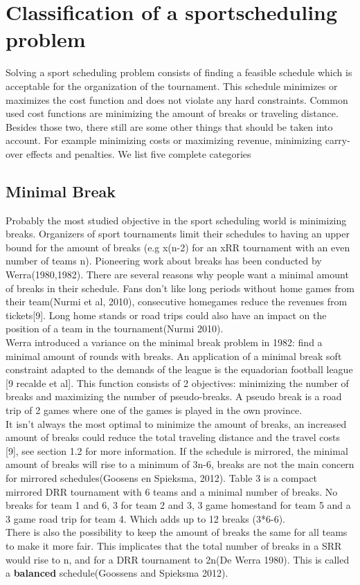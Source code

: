 \section{Classification of a sportscheduling problem}
Solving a sport scheduling problem consists of finding a feasible schedule which is acceptable for the organization of the tournament. This schedule minimizes or maximizes the cost function and does not violate any hard constraints. Common used cost functions are minimizing the amount of breaks or traveling distance. Besides those two, there still are some other things that should be taken into account. For example minimizing costs or maximizing revenue, minimizing carry-over effects  and penalties. We list five complete categories

\subsection{Minimal Break}
Probably the most studied objective in the sport scheduling world is minimizing breaks. Organizers of sport tournaments limit their schedules to having an upper bound for the amount of breaks (e.g x(n-2) for an xRR tournament with an even number of teams n). Pioneering work about breaks has been conducted by Werra(1980,1982). There are several reasons why people want a minimal amount of breaks in their schedule. Fans don’t like long periods without home games from their team(Nurmi et al, 2010), consecutive homegames reduce the revenues from tickets[9]. Long home stands or road trips could also have an impact on the position of a team in the tournament(Nurmi 2010).
\\[5px]
Werra introduced a variance on the minimal break problem in 1982: find a minimal amount of rounds with breaks. An application of a minimal break soft constraint adapted to the demands of the league is the equadorian football league [9 recalde et al]. This function consists of 2 objectives: minimizing the number of breaks and maximizing the number of pseudo-breaks. A pseudo break is a road trip of 2 games where one of the games is played in the own province.
\\[5px] 
It isn’t always the most optimal to minimize the amount of breaks, an increased amount of breaks could reduce the total traveling distance and the travel costs [9], see section 1.2 for more information. If the schedule is mirrored, the minimal amount of breaks will rise to a minimum of 3n-6, breaks are not the main concern for mirrored schedules(Goosens en Spieksma, 2012). Table 3 is a compact mirrored DRR tournament with 6 teams and a minimal number of breaks. No breaks for team 1 and 6, 3 for team 2 and 3, 3 game homestand for team 5 and a 3 game road trip for team 4. Which adds up to 12 breaks (3*6-6). 
\\[5px]
There is also the possibility to keep the amount of breaks the same for all teams to make it more fair. This implicates that the total number of breaks in a SRR would rise to n, and for a DRR tournament to 2n(De Werra 1980). This is called a \textbf{balanced} schedule(Goossens and Spieksma 2012).

